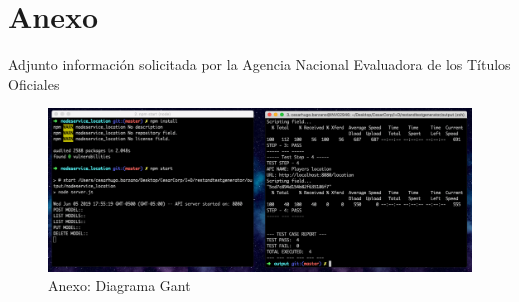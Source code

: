 \documentclass[a4paper,11pt]{book}
\begin{document}
\chapter{Anexo}

Adjunto información solicitada por la Agencia Nacional Evaluadora de los Títulos Oficiales

\begin{figure}[H]  
\centering 
\includegraphics[scale=0.40]{imagenes/t24.png}
\caption{ Anexo: Diagrama Gant}  
\end{figure} 



%
%
%
%

%
%

\thispagestyle{empty}
\end{document}
